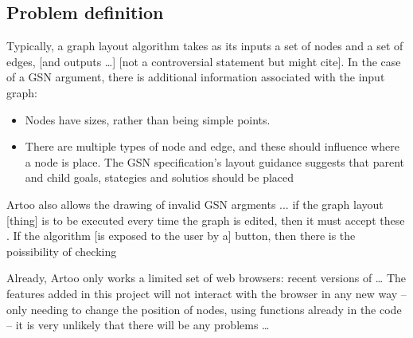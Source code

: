 \subsection{Problem definition}

Typically, a graph layout algorithm takes as its inputs a set of nodes and a set of edges, [and outputs \ldots] [not a controversial statement but might cite].
In the case of a GSN argument, there is additional information associated with the input graph:

\begin{itemize}
  \item
    Nodes have sizes, rather than being simple points. 
  \item
    There are multiple types of node and edge, and these should influence where a node is place. The GSN specification's layout guidance suggests that parent and child goals, stategies and solutios should be placed 
\end{itemize}

Artoo also allows the drawing of invalid GSN argments ...
if the graph layout [thing] is to be executed every time the graph is edited, then it must accept these .
If the algorithm [is exposed to the user by a] button, then there is the poissibility of checking 

Already, Artoo only works a limited set of web browsers: recent versions of \ldots
The features added in this project will not interact with the browser in any new way -- only needing to change the position of nodes, using functions already in the code -- it is very unlikely that there will be any problems \ldots